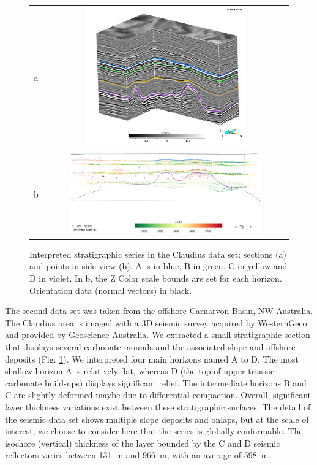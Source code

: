 \documentclass[preprint]{ring20}
\begin{document}
{\begin{figure}
\centering\begin{tabular}{cc}
a & \includegraphics[width=0.7\textwidth,height=6cm]{Claudius}\\
b & \includegraphics[width=0.8\textwidth]{Claudius1} \\
\end{tabular}
\caption{Interpreted stratigraphic series in the Claudius data set: sections (a) and points in side view (b). A is in blue, B in green, C in yellow and D in violet. In b, the Z Color scale bounds are set for each horizon. Orientation data (normal vectors) in black.}
\label{fig:ClaudiusData}
\end{figure}

The second data set was taken from the offshore Carnarvon Basin, NW Australia. The Claudius area is imaged with a 3D seismic survey acquired by WesternGeco and provided by Geoscience Australia. We extracted a small stratigraphic section that displays several carbonate mounds and the associated slope and offshore deposits (Fig. \ref{fig:ClaudiusData}). We interpreted four main horizons named A to D. The most shallow horizon A is relatively flat, whereas D (the top of upper triassic carbonate build-ups) displays significant relief. The intermediate horizons B and C are slightly deformed maybe due to differential compaction. Overall, significant layer thickness variations exist between these stratigraphic surfaces. The detail of the seismic data set shows multiple slope deposits and onlaps, but at the scale of interest, we choose to consider here that the series is globally conformable. The isochore (vertical) thickness of the layer bounded by the C and D seismic reflectors varies between 131~m and 966~m, with an average of 598~m. 

}
\end{document}
